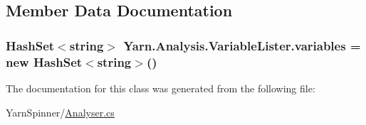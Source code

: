 \subsection{Member Data Documentation}
\hypertarget{a00165_a64ed6c3394c474b6cf5804a35f560746}{
\subsubsection[{variables}]{\setlength{\rightskip}{0pt plus 5cm}Hash\-Set$<$string$>$ Yarn.\-Analysis.\-Variable\-Lister.\-variables = new Hash\-Set$<$string$>$()\hspace{0.3cm}{\ttfamily [private]}}}\label{a00165_a64ed6c3394c474b6cf5804a35f560746}


The documentation for this class was generated from the following file\-:\begin{DoxyCompactItemize}
\item 
Yarn\-Spinner/\hyperlink{a00263}{Analyser.\-cs}\end{DoxyCompactItemize}
